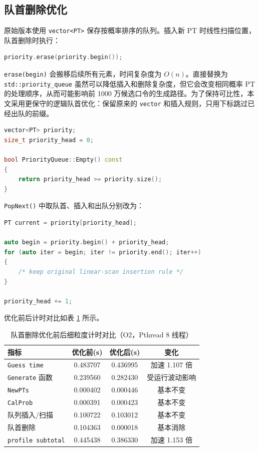 \documentclass[UTF8,a4paper,12pt]{ctexart}
\begin{document}
\subsection{队首删除优化}

原始版本使用 \texttt{vector<PT>} 保存按概率排序的队列。插入新 PT 时线性扫描位置，队首删除时执行：

\begin{lstlisting}[language=C++]
priority.erase(priority.begin());
\end{lstlisting}

\texttt{erase(begin)} 会搬移后续所有元素，时间复杂度为 $O(n)$。直接替换为 \texttt{std::priority\_queue} 虽然可以降低插入和删除复杂度，但它会改变相同概率 PT 的处理顺序，从而可能影响前 1000 万候选口令的生成路径。为了保持可比性，本文采用更保守的逻辑队首优化：保留原来的 \texttt{vector} 和插入规则，只用下标跳过已经出队的前缀。

\begin{lstlisting}[language=C++]
vector<PT> priority;
size_t priority_head = 0;

bool PriorityQueue::Empty() const
{
    return priority_head >= priority.size();
}
\end{lstlisting}

\texttt{PopNext()} 中取队首、插入和出队分别改为：

\begin{lstlisting}[language=C++]
PT current = priority[priority_head];

auto begin = priority.begin() + priority_head;
for (auto iter = begin; iter != priority.end(); iter++)
{
    /* keep original linear-scan insertion rule */
}

priority_head += 1;
\end{lstlisting}

优化前后计时对比如表 \ref{tab:queue-head} 所示。

\begin{table}[htbp]
  \centering
  \caption{队首删除优化前后细粒度计时对比（O2，Pthread 8 线程）}
  \label{tab:queue-head}
  \begin{tabular}{lccc}
    \toprule
    指标 & 优化前(s) & 优化后(s) & 变化 \\
    \midrule
    \texttt{Guess time} & 0.483707 & 0.436995 & 加速 1.107 倍 \\
    \texttt{Generate} 函数 & 0.239560 & 0.282430 & 受运行波动影响 \\
    \texttt{NewPTs} & 0.000402 & 0.000446 & 基本不变 \\
    \texttt{CalProb} & 0.000391 & 0.000423 & 基本不变 \\
    队列插入/扫描 & 0.100722 & 0.103012 & 基本不变 \\
    队首删除 & 0.104363 & 0.000018 & 基本消除 \\
    \texttt{profile subtotal} & 0.445438 & 0.386330 & 加速 1.153 倍 \\
    \bottomrule
  \end{tabular}
\end{table}
\end{document}
